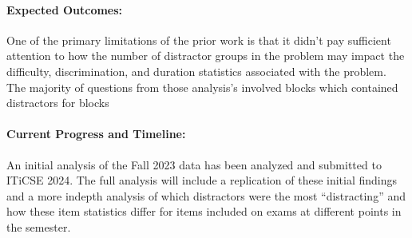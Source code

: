 \documentclass[authorversion,nonacm]{acmart}
\begin{document}
\paragraph{Expected Outcomes:} One of the primary limitations of the prior work
is that it didn't pay sufficient attention to how the number of distractor 
groups in the problem may impact the difficulty, discrimination, and duration
statistics associated with the problem. The majority of questions from those 
analysis's involved blocks which contained distractors for blocks 

\paragraph{Current Progress and Timeline:} 
An initial analysis of the Fall 2023 data has been analyzed and submitted to
ITiCSE 2024. The full analysis will include a replication of these initial
findings and a more indepth analysis of which distractors were the most
``distracting'' and how these item statistics differ for items included on
exams at different points in the semester.




\balance

\end{document}
